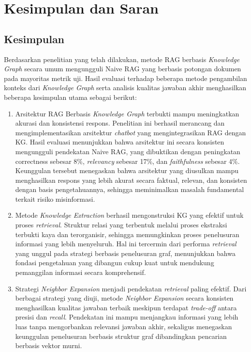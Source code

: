 \chapter{Kesimpulan dan Saran}
\section{Kesimpulan}
Berdasarkan penelitian yang telah dilakukan, metode RAG berbasis \textit{Knowledge Graph} secara umum mengungguli Naive RAG yang berbasis potongan dokumen pada mayoritas metrik uji.
Hasil evaluasi terhadap beberapa metode pengambilan konteks dari \textit{Knowledge Graph} serta analisis kualitas jawaban akhir menghasilkan beberapa kesimpulan utama sebagai berikut:

\begin{enumerate}
      \item Arsitektur RAG Berbasis \textit{Knowledge Graph} terbukti mampu meningkatkan akurasi dan konsistensi respons.
            Penelitian ini berhasil merancang dan mengimplementasikan arsitektur \textit{chatbot} yang mengintegrasikan RAG dengan KG.
            Hasil evaluasi menunjukkan bahwa arsitektur ini secara konsisten mengungguli pendekatan Naive RAG, yang dibuktikan dengan peningkatan \textlatin{correctness} sebesar 8\%, \textit{relevancy} sebesar 17\%, dan \textit{faithfulness} sebesar 4\%.
            Keunggulan tersebut menegaskan bahwa arsitektur yang diusulkan mampu menghasilkan respons yang lebih akurat secara faktual, relevan, dan konsisten dengan basis pengetahuannya, sehingga meminimalkan masalah fundamental terkait risiko misinformasi.

      \item Metode \textit{Knowledge Extraction} berhasil mengonstruksi KG yang efektif untuk proses \textit{retrieval}.
            Struktur relasi yang terbentuk melalui proses ekstraksi terbukti kaya dan terorganisir, sehingga memungkinkan proses penelusuran informasi yang lebih menyeluruh.
            Hal ini tercermin dari performa \textit{retrieval} yang unggul pada strategi berbasis penelusuran graf, menunjukkan bahwa fondasi pengetahuan yang dibangun cukup kuat untuk mendukung pemanggilan informasi secara komprehensif.

      \item Strategi \textit{Neighbor Expansion} menjadi pendekatan \textit{retrieval} paling efektif.
            Dari berbagai strategi yang diuji, metode \textit{Neighbor Expansion} secara konsisten menghasilkan kualitas jawaban terbaik meskipun terdapat \textit{trade-off} antara presisi dan \textit{recall}.
            Pendekatan ini mampu menjangkau informasi yang lebih luas tanpa mengorbankan relevansi jawaban akhir, sekaligus menegaskan keunggulan penelusuran berbasis struktur graf dibandingkan pencarian berbasis vektor murni.
\end{enumerate}


